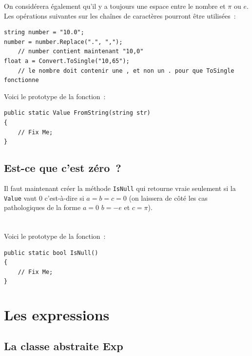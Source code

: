 \documentclass[12pt,a4paper]{report}
\begin{document}
On considérera également qu'il y a toujours une espace entre le nombre et $\pi$ ou $e$.\\

Les opérations suivantes sur les chaînes de caractères pourront être utilisées~:

\begin{lstlisting}
string number = "10.0";
number = number.Replace(".", ",");
	// number contient maintenant "10,0"
float a = Convert.ToSingle("10,65");
	// le nombre doit contenir une , et non un . pour que ToSingle fonctionne
\end{lstlisting}

Voici le prototype de la fonction~:

\begin{lstlisting}
public static Value FromString(string str)
{
	// Fix Me;
}
\end{lstlisting}


\subsection{Est-ce que c'est zéro~?}

Il faut maintenant créer la méthode \texttt{IsNull} qui retourne vraie seulement si la \texttt{Value} vaut 0 c'est-à-dire si $a=b=c=0$ (on laissera de côté les cas pathologiques de la forme $a=0$ $b=-e$ et $c=\pi$).\\\\\\

Voici le prototype de la fonction~:

\begin{lstlisting}
public static bool IsNull()
{
	// Fix Me;
}
\end{lstlisting}




\section{Les expressions}

\subsection{La classe abstraite {\ttfamily Exp}}
\end{document}
